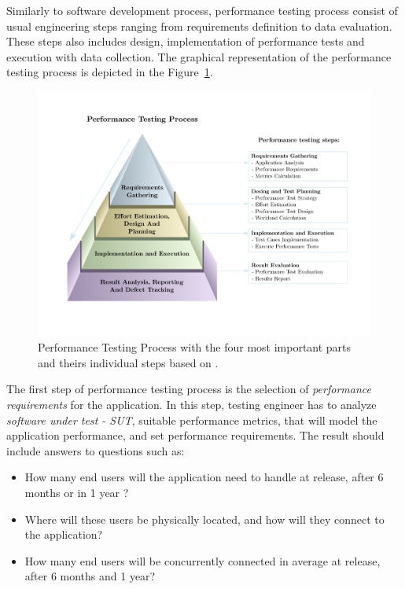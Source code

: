 Similarly to software development process, performance testing process consist of usual engineering steps ranging from requirements definition to data evaluation. These steps also includes design, implementation of performance tests and execution with data collection. The graphical representation of the performance testing process is depicted in the Figure~\ref{fig:performace_testing_process}. 

\begin{figure}[H]
  \includegraphics[width=16cm]{obrazky-figures/pyramid.pdf}
  \captionsetup{justification=centering}
  \caption{Performance Testing Process with the four most important parts and theirs individual steps based on \cite{Sharma:HP}.}
  \label{fig:performace_testing_process}
\end{figure}

The first step of performance testing process is the selection of \emph{performance requirements} for the application. In this step, testing engineer has to analyze \emph{software under test - SUT}, suitable performance metrics, that will model the application performance, and set performance requirements. The result should include answers to questions such as:

\begin{itemize}
	\setlength\itemsep{0em}
	\item How many end users will the application need to handle at release, after 6 months or in 1 year ?
	\item Where will these users be physically located, and how will they connect to the application?
	\item How many end users will be concurrently connected in average at release, after 6 months and 1 year?
\end{itemize}

